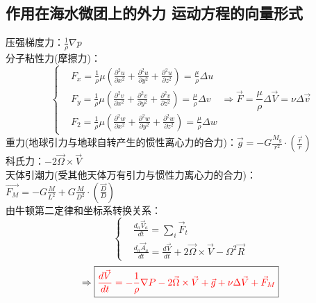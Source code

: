 \documentclass[a4paper,12pt]{article}
\begin{document}
    \subsection{作用在海水微团上的外力 运动方程的向量形式}
    压强梯度力：$\displaystyle\frac{1}{\rho}\nabla p$\\
    分子粘性力(摩擦力)：
    \[
        \left\{
        \begin{aligned}
            &F_{x}=\frac{1}{\rho} \mu\left(\frac{\partial^{2} u}{\partial x^{2}}+\frac{\partial^{2} u}{\partial y^{2}}+\frac{\partial^{2} u}{\partial z^{2}}\right)=\frac{\mu}{\rho} \Delta u\\
            &F_{y}=\frac{1}{\rho} \mu\left(\frac{\partial^{2} v}{\partial x^{2}}+\frac{\partial^{2} v}{\partial y^{2}}+\frac{\partial^{2} v}{\partial z^{2}}\right)=\frac{\mu}{\rho} \Delta v\\
            &F_{2}=\frac{1}{\rho} \mu\left(\frac{\partial^{2} w}{\partial x^{2}}+\frac{\partial^{2} w}{\partial y^{2}}+\frac{\partial^{2} w}{\partial z^{2}}\right)=\frac{\mu}{\rho} \Delta w
        \end{aligned}
        \right.
        \Rightarrow \vec{F}=\frac{\mu}{\rho}\Delta \vec{V}=\nu\Delta\vec{v}
    \]
    重力(地球引力与地球自转产生的惯性离心力的合力)：$\displaystyle\vec{g}=-G\frac{M_g}{r^2}\cdot\left(\frac{\vec{r}}{r}\right)$\\
    科氏力：$\displaystyle -2\vec{\Omega}\times\vec{V}$\\
    天体引潮力(受其他天体万有引力与惯性力离心力的合力)：$\displaystyle\vec{F_M}=-G\frac{M}{L^2}+G\frac{M}{D^2}\cdot\left(\frac{\vec{D}}{D}\right)$\\
    由牛顿第二定律和坐标系转换关系：
    \[
        \left\{
        \begin{aligned}
            &\frac{d_{a} \vec{V}_{a}}{d t}=\sum_{i} \vec{F}_{t}\\
            &\frac{d_{a} \vec{A}_{a}}{d t}=\frac{d \vec{V}}{d t}+2 \vec{\Omega} \times \vec{V}-\Omega^{2} \vec{R}
        \end{aligned}
        \right.
    \]
    \[
        \Rightarrow\boxed{\color{red} \frac{d \vec{V}}{d t}=-\frac{1}{\rho} \nabla P-2 \vec{\Omega} \times \vec{V}+\vec{g} +\nu \Delta \vec{V}+\vec{F}_{M}}
    \]
\end{document}
